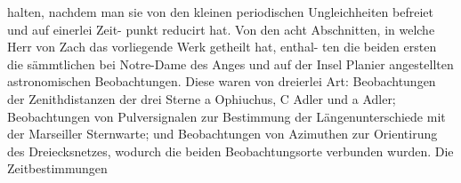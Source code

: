 \documentclass[12pt,a4paper]{article}
\begin{document}
halten, nachdem man sie von den kleinen periodischen Ungleichheiten befreiet und auf einerlei Zeit-\newline
punkt reducirt hat.\newline
Von den acht Abschnitten, in welche Herr von Zach das vorliegende Werk getheilt hat, enthal-\newline
ten die beiden ersten die sämmtlichen bei Notre-Dame des Anges und auf der Insel Planier angestellten\newline
astronomischen Beobachtungen. Diese waren von dreierlei Art: Beobachtungen der Zenithdistanzen der\newline
drei Sterne a Ophiuchus, C Adler und a Adler; Beobachtungen von Pulversignalen zur Bestimmung der\newline
Längenunterschiede mit der Marseiller Sternwarte; und Beobachtungen von Azimuthen zur Orientirung\newline
des Dreiecksnetzes, wodurch die beiden Beobachtungsorte verbunden wurden. Die Zeitbestimmungen\newline
\end{document}
